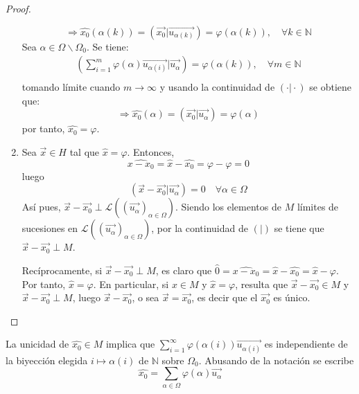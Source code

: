 \documentclass[12pt]{report}
\theoremstyle{largebreak}
\newcommand\pint[2]{\ensuremath{\left(#1\big| #2\right)}}
\begin{document}
\begin{proof}
\begin{enumerate}
\begin{equation*}
                \Rightarrow \hat{x_0}(\alpha(k))=\pint{\vec{x_0}}{\vec{u_{\alpha(k)}}}=\varphi(\alpha(k)),\quad\forall k\in\mathbb{N}
            \end{equation*}
            Sea $\alpha\in\Omega\backslash\Omega_0$. Se tiene:
            \begin{equation*}
                \begin{split}
                    \pint{\sum_{i=1 }^{m}\varphi(\alpha)\vec{u_{\alpha(i)}}}{\vec{u_{\alpha}}}=\varphi(\alpha(k)),\quad\forall m\in\mathbb{N} \\
                \end{split}
            \end{equation*}
            tomando límite cuando $m\rightarrow\infty$ y usando la continuidad de $\pint{\cdot}{\cdot}$ se obtiene que:
            \begin{equation*}
                \Rightarrow \hat{x_0}(\alpha)=\pint{\vec{x_0}}{\vec{u_{\alpha}}}=\varphi(\alpha)
            \end{equation*}
            por tanto, $\hat{x_0}=\varphi$.

            \item Sea $\vec{x}\in H$ tal que $\hat{x}=\varphi$. Entonces,
            \begin{equation*}
                \widehat{x-x_0}=\hat{x}-\hat{x_0}=\varphi-\varphi=0
            \end{equation*}
            luego
            \begin{equation*}
                \pint{\vec{x}-\vec{x_0}}{\vec{u_\alpha}}=0\quad\forall\alpha\in\Omega
            \end{equation*}
            Así pues, $\vec{x}-\vec{x_0}\perp\mathcal{L}((\vec{u_\alpha})_{\alpha\in\Omega})$. Siendo los elementos de $M$ límites de sucesiones en $\mathcal{L}((\vec{u_\alpha})_{\alpha\in\Omega})$, por la continuidad de $\pint{}{}$ se tiene que $\vec{x}-\vec{x_0}\perp M$.

            Recíprocamente, si $\vec{x}-\vec{x_0}\perp M$, es claro que $\hat{0}=\widehat{x-x_0}=\hat{x}-\hat{x_0}=\hat{x}-\varphi$. Por tanto, $\hat{x}=\varphi$. En particular, si $x\in M$ y $\hat{x}=\varphi$, resulta que $\vec{x}-\vec{x_0}\in M$ y $\vec{x}-\vec{x_0}\perp M$, luego $\vec{x}-\vec{x_0}$, o sea $\vec{x}=\vec{x_0}$, es decir que el $\vec{x_0}$ es único.
        \end{enumerate}
    \end{proof}

    \begin{obs}
        La unicidad de $\hat{x_0}\in M$ implica que $\sum_{i=1}^{\infty}\varphi(\alpha(i))\vec{u_{\alpha(i)}}$ es independiente de la biyección elegida $i\mapsto \alpha(i)$ de $\mathbb{N}$ sobre $\Omega_0$. Abusando de la notación se escribe
        \begin{equation*}
            \hat{x_0}=\sum_{\alpha\in\Omega}\varphi(\alpha)\vec{u_\alpha}
        \end{equation*}
    \end{obs}
\end{document}
